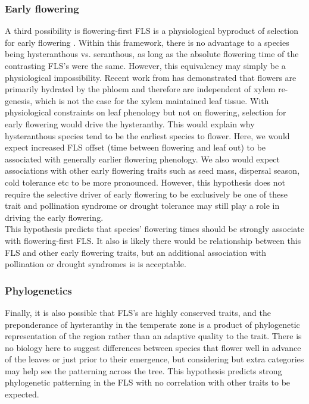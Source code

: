 \documentclass[12pt]{article}\usepackage[]{graphicx}\usepackage[]{color}
\begin{document}
\subsubsection*{Early flowering}
\indent\indent A third possibility is flowering-first FLS is a physiological byproduct of selection for early flowering \citep{Primack1987}.%
Within this framework, there is no advantage to a species being hysteranthous vs. seranthous, as long as the absolute flowering time of the contrasting FLS's were the same. However, this equivalency may simply be a physiological impossibility. Recent work from \citet{Savage2019} has demonstrated that flowers are primarily hydrated by the phloem and therefore are independent of xylem re-genesis, which is not the case for the xylem maintained leaf tissue. With physiological constraints on leaf phenology but not on flowering, selection for early flowering would drive the hysteranthy. This would explain why hysteranthous species tend to be the earliest species to flower. Here, we would expect increased FLS offset (time between flowering and leaf out) to be associated with generally earlier flowering phenology. We also would expect associations with other early flowering traits such as seed mass, dispersal season, cold tolerance etc to be more pronounced. However, this hypothesis does not require the selective driver of early flowering to be exclusively be one of these trait and pollination syndrome or drought tolerance may still play a role in driving the early flowering.\\
\indent This hypothesis predicts that species' flowering times should be strongly associate with flowering-first FLS. It also is likely there would be relationship between this FLS and other early flowering traits, but an additional association with pollination or drought syndromes is is acceptable. 
\subsubsection*{Phylogenetics} 
\indent\indent Finally, it is also possible that FLS's are highly conserved traits, and the preponderance of hysteranthy in the temperate zone is a product of phylogenetic representation of the region rather than an adaptive quality to the trait. There is no biology here to suggest differences between species that flower well in advance of the leaves or just prior to their emergence, but considering but extra categories may help see the patterning across the tree. This hypothesis predicts strong phylogenetic patterning in the FLS with no correlation with other traits to be expected.\\
\end{document}
